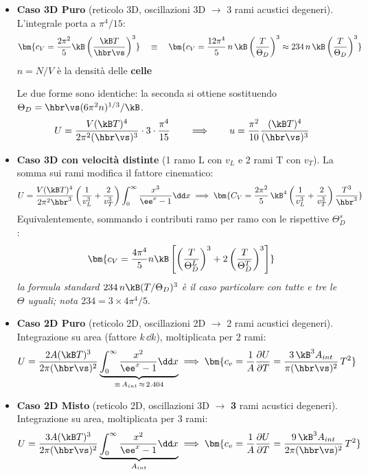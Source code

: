 \begin{itemize}
    \item \textbf{Caso 3D Puro} (reticolo 3D, oscillazioni 3D $\to$ 3 rami acustici degeneri). L'integrale porta a $\pi^4/15$:
    \[ \bm{c_V = \frac{2\pi^2}{5}\kB\left(\frac{\kB T}{\hbr \vs}\right)^{3}}
       \quad\equiv\quad
       \bm{c_V = \frac{12\pi^4}{5}\,n\,\kB\left(\frac{T}{\Theta_D}\right)^{3} \approx 234\, n\,\kB\left(\frac{T}{\Theta_D}\right)^{3}} \]
    $n = N/V$ è la densità delle \textbf{celle}
    
    Le due forme sono identiche: la seconda si ottiene sostituendo $\Theta_D = \hbr \vs (6\pi^2 n)^{1/3}/\kB$.
    \[ U = \frac{V(\kB T)^4}{2\pi^2(\hbr \vs)^3}\cdot 3\cdot\frac{\pi^4}{15}
       \qquad\Longrightarrow\qquad u = \frac{\pi^2}{10}\frac{(\kB T)^4}{(\hbr \vs)^3} \]

    \item \textbf{Caso 3D con velocità distinte} (1 ramo L con $v_L$ e 2 rami T con $v_T$). La somma sui rami modifica il fattore cinematico:
    \[ U = \frac{V (\kB T)^4}{2\pi^2 \hbr^3}\left(\frac{1}{v_L^3}+\frac{2}{v_T^3}\right)\int_0^\infty\frac{x^3}{\ee^x-1}\dd x
       \implies \bm{C_V = \frac{2\pi^2}{5}\,\kB^4\left(\frac{1}{v_L^3}+\frac{2}{v_T^3}\right)\frac{T^3}{\hbr^3}} \]
    Equivalentemente, sommando i contributi ramo per ramo con le rispettive $\Theta_D^{s}$:
    \[ \bm{c_V = \frac{4\pi^4}{5}n\kB\left[\left(\frac{T}{\Theta_D^{L}}\right)^3 + 2\left(\frac{T}{\Theta_D^{T}}\right)^3\right]} \]
    \textit{la formula standard $234\,n\kB(T/\Theta_D)^3$ è il caso particolare con tutte e tre le $\Theta$ uguali; nota $234 = 3\times 4\pi^4/5$}.

    \item \textbf{Caso 2D Puro} (reticolo 2D, oscillazioni 2D $\to$ 2 rami acustici degeneri). Integrazione su area (fattore $k\,\dd k$), moltiplicata per 2 rami:
    \[ U = \frac{2 A (\kB T)^3}{2\pi (\hbr \vs)^2}\underbrace{\int_0^\infty \frac{x^2}{\ee^x - 1}\dd x}_{\equiv\,A_{int}\,\approx\,2.404}
       \implies \bm{c_v = \frac{1}{A}\frac{\partial U}{\partial T} = \frac{3\,\kB^3 A_{int}}{\pi(\hbr \vs)^2}\,T^2} \]

    \item \textbf{Caso 2D Misto} (reticolo 2D, oscillazioni 3D $\to$ \textbf{3} rami acustici degeneri). Integrazione su area, moltiplicata per 3 rami:
    \[ U = \frac{3 A (\kB T)^3}{2\pi (\hbr \vs)^2}\underbrace{\int_0^\infty \frac{x^2}{\ee^x - 1}\dd x}_{A_{int}}
       \implies \bm{c_v = \frac{1}{A}\frac{\partial U}{\partial T} = \frac{9\,\kB^3 A_{int}}{2\pi(\hbr \vs)^2}\,T^2} \]



\end{itemize}
